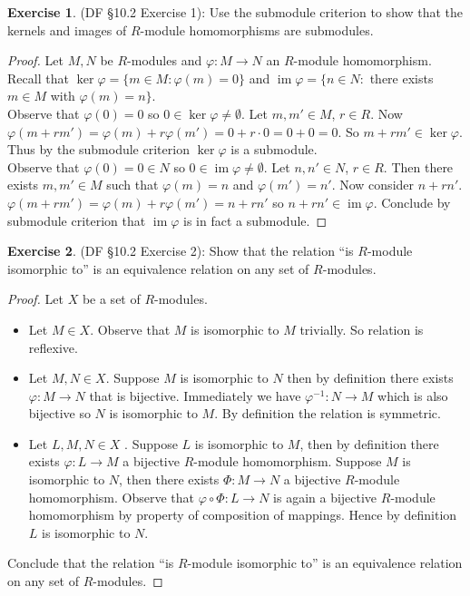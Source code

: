 \documentclass[8pt]{amsart}
\theoremstyle{plain}%
\theoremstyle{definition}
\newtheorem*{exercise}{Exercise}%
\theoremstyle{remark}
\numberwithin{equation}{section}
\newcommand{\im}{\operatorname{im}}
\begin{document}
\begin{exercise}
(DF \S 10.2 Exercise 1): Use the submodule criterion to show that the kernels and images of $R$-module homomorphisms are submodules.
	\begin{proof}
		Let $M, N$ be $R$-modules and $\varphi : M \to N$ an $R$-module homomorphism. Recall that $\ker \varphi = \{m \in M : \varphi(m) = 0\}$ and $\im \varphi = \{n \in N : $ there exists $m \in M$ with $\varphi(m) = n\}$.\\

		Observe that $\varphi(0) = 0$ so $0 \in \ker \varphi \neq \emptyset$. Let $m, m' \in M$, $r \in R$. Now $\varphi(m + rm') = \varphi(m) + r\varphi(m') = 0 + r \cdot 0 = 0 + 0 = 0$. So $m + rm' \in \ker \varphi$. Thus by the submodule criterion $\ker \varphi$ is a submodule.\\

		Observe that $\varphi(0) = 0 \in N$ so $0 \in \im \varphi \neq \emptyset$. Let $n, n' \in N$, $r \in R$. Then there exists $m, m' \in M$ such that $\varphi(m) = n$ and $\varphi(m') = n'$. Now consider $n + rn'$. $\varphi(m + rm') = \varphi(m) + r\varphi(m') = n + rn'$ so $n + rn' \in \im \varphi$. Conclude by submodule criterion that $\im \varphi$ is in fact a submodule.
	\end{proof}
\end{exercise}

\begin{exercise}
(DF \S 10.2 Exercise 2): Show that the relation ``is $R$-module isomorphic to'' is an equivalence relation on any set of $R$-modules.
	\begin{proof}
		Let $X$ be a set of $R$-modules.
		\begin{itemize}
			\item Let $M \in X$. Observe that $M$ is isomorphic to $M$ trivially. So relation is reflexive.
			\item Let $M, N \in X$. Suppose $M$ is isomorphic to $N$ then by definition there exists $\varphi : M \to N$ that is bijective. Immediately we have $\varphi^{-1} : N \to M$ which is also bijective so $N$ is isomorphic to $M$. By definition the relation is symmetric.
			\item Let $L, M, N \in X$ . Suppose $L$ is isomorphic to $M$, then by definition there exists $\varphi : L \to M$ a bijective $R$-module homomorphism. Suppose $M$ is isomorphic to $N$, then there exists $\Phi : M \to N$ a bijective $R$-module homomorphism. Observe that $\varphi \circ \Phi : L \to N$ is again a bijective $R$-module homomorphism by property of composition of mappings. Hence by definition $L$ is isomorphic to $N$.
		\end{itemize}
		Conclude that the relation ``is $R$-module isomorphic to'' is an equivalence relation on any set of $R$-modules.
	\end{proof}
\end{exercise}
\end{document}
